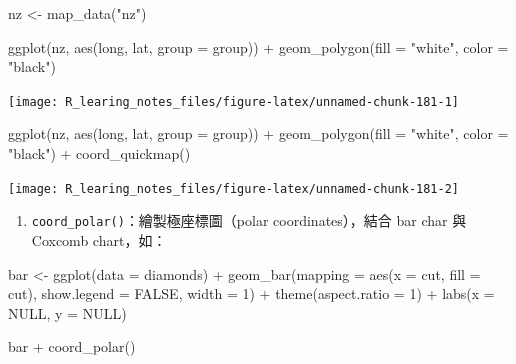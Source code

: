 \documentclass[
]{book}
\newenvironment{Shaded}{\begin{snugshade}}{\end{snugshade}}
\newcommand{\AttributeTok}[1]{\textcolor[rgb]{0.77,0.63,0.00}{#1}}
\newcommand{\ConstantTok}[1]{\textcolor[rgb]{0.00,0.00,0.00}{#1}}
\newcommand{\DecValTok}[1]{\textcolor[rgb]{0.00,0.00,0.81}{#1}}
\newcommand{\FunctionTok}[1]{\textcolor[rgb]{0.00,0.00,0.00}{#1}}
\newcommand{\NormalTok}[1]{#1}
\newcommand{\OtherTok}[1]{\textcolor[rgb]{0.56,0.35,0.01}{#1}}
\newcommand{\SpecialCharTok}[1]{\textcolor[rgb]{0.00,0.00,0.00}{#1}}
\newcommand{\StringTok}[1]{\textcolor[rgb]{0.31,0.60,0.02}{#1}}
\providecommand{\tightlist}{%
  \setlength{\itemsep}{0pt}\setlength{\parskip}{0pt}}
\theoremstyle{definition}
\theoremstyle{remark}
\begin{document}
\begin{Shaded}
\begin{Highlighting}[]
\NormalTok{nz }\OtherTok{\textless{}{-}} \FunctionTok{map\_data}\NormalTok{(}\StringTok{"nz"}\NormalTok{)}

\FunctionTok{ggplot}\NormalTok{(nz, }\FunctionTok{aes}\NormalTok{(long, lat, }\AttributeTok{group =}\NormalTok{ group)) }\SpecialCharTok{+} 
  \FunctionTok{geom\_polygon}\NormalTok{(}\AttributeTok{fill =} \StringTok{"white"}\NormalTok{, }\AttributeTok{color =} \StringTok{"black"}\NormalTok{)}
\end{Highlighting}
\end{Shaded}

\begin{center}\texttt{[image: R\_learing\_notes\_files/figure-latex/unnamed-chunk-181-1]} \end{center}

\begin{Shaded}
\begin{Highlighting}[]
\FunctionTok{ggplot}\NormalTok{(nz, }\FunctionTok{aes}\NormalTok{(long, lat, }\AttributeTok{group =}\NormalTok{ group)) }\SpecialCharTok{+} 
  \FunctionTok{geom\_polygon}\NormalTok{(}\AttributeTok{fill =} \StringTok{"white"}\NormalTok{, }\AttributeTok{color =} \StringTok{"black"}\NormalTok{) }\SpecialCharTok{+} \FunctionTok{coord\_quickmap}\NormalTok{()}
\end{Highlighting}
\end{Shaded}

\begin{center}\texttt{[image: R\_learing\_notes\_files/figure-latex/unnamed-chunk-181-2]} \end{center}

\begin{enumerate}
\def\labelenumi{\arabic{enumi}.}
\setcounter{enumi}{2}
\tightlist
\item
  \texttt{coord\_polar()}：繪製極座標圖（polar coordinates），結合 bar char 與 Coxcomb chart，如：
\end{enumerate}

\begin{Shaded}
\begin{Highlighting}[]
\NormalTok{bar }\OtherTok{\textless{}{-}} \FunctionTok{ggplot}\NormalTok{(}\AttributeTok{data =}\NormalTok{ diamonds) }\SpecialCharTok{+}
  \FunctionTok{geom\_bar}\NormalTok{(}\AttributeTok{mapping =} \FunctionTok{aes}\NormalTok{(}\AttributeTok{x =}\NormalTok{ cut, }\AttributeTok{fill =}\NormalTok{ cut), }\AttributeTok{show.legend =} \ConstantTok{FALSE}\NormalTok{, }\AttributeTok{width =} \DecValTok{1}\NormalTok{) }\SpecialCharTok{+}
  \FunctionTok{theme}\NormalTok{(}\AttributeTok{aspect.ratio =} \DecValTok{1}\NormalTok{) }\SpecialCharTok{+} \FunctionTok{labs}\NormalTok{(}\AttributeTok{x =} \ConstantTok{NULL}\NormalTok{, }\AttributeTok{y =} \ConstantTok{NULL}\NormalTok{)}

\NormalTok{bar }\SpecialCharTok{+} \FunctionTok{coord\_polar}\NormalTok{()}
\end{Highlighting}
\end{Shaded}
\end{document}
